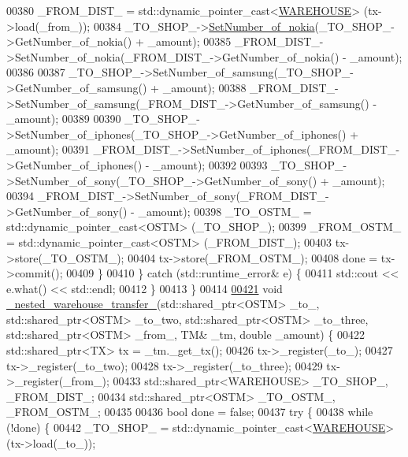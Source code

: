 \begin{DoxyCode}
00380             \_FROM\_DIST\_ = std::dynamic\_pointer\_cast<\hyperlink{class_w_a_r_e_h_o_u_s_e}{WAREHOUSE}> (tx->load(\_from\_));
00384             \_TO\_SHOP\_->\hyperlink{class_w_a_r_e_h_o_u_s_e_a13ace834a25aab61c689a7cedad94343}{SetNumber\_of\_nokia}(\_TO\_SHOP\_->GetNumber\_of\_nokia() + \_amount);
00385             \_FROM\_DIST\_->SetNumber\_of\_nokia(\_FROM\_DIST\_->GetNumber\_of\_nokia() - \_amount);
00386 
00387             \_TO\_SHOP\_->SetNumber\_of\_samsung(\_TO\_SHOP\_->GetNumber\_of\_samsung() + \_amount);
00388             \_FROM\_DIST\_->SetNumber\_of\_samsung(\_FROM\_DIST\_->GetNumber\_of\_samsung() - \_amount);
00389 
00390             \_TO\_SHOP\_->SetNumber\_of\_iphones(\_TO\_SHOP\_->GetNumber\_of\_iphones() + \_amount);
00391             \_FROM\_DIST\_->SetNumber\_of\_iphones(\_FROM\_DIST\_->GetNumber\_of\_iphones() - \_amount);
00392 
00393             \_TO\_SHOP\_->SetNumber\_of\_sony(\_TO\_SHOP\_->GetNumber\_of\_sony() + \_amount);
00394             \_FROM\_DIST\_->SetNumber\_of\_sony(\_FROM\_DIST\_->GetNumber\_of\_sony() - \_amount);
00398             \_TO\_OSTM\_ = std::dynamic\_pointer\_cast<OSTM> (\_TO\_SHOP\_);
00399             \_FROM\_OSTM\_ = std::dynamic\_pointer\_cast<OSTM> (\_FROM\_DIST\_);
00403             tx->store(\_TO\_OSTM\_);
00404             tx->store(\_FROM\_OSTM\_);
00408             done = tx->commit();
00409         \}
00410     \} \textcolor{keywordflow}{catch} (std::runtime\_error& e) \{
00411         std::cout << e.what() << std::endl;
00412     \}
00413 \}
00414 
\hypertarget{main_8cpp_source.tex_l00421}{}\hyperlink{main_8cpp_a52fcb0d50c67be8cd20f2aca338683c7}{00421} \textcolor{keywordtype}{void} \hyperlink{main_8cpp_a52fcb0d50c67be8cd20f2aca338683c7}{\_nested\_warehouse\_transfer\_}(std::shared\_ptr<OSTM> \_to\_, 
      std::shared\_ptr<OSTM> \_to\_two, std::shared\_ptr<OSTM> \_to\_three, std::shared\_ptr<OSTM> \_from\_, TM& \_tm, \textcolor{keywordtype}{double} \_amount) \{
00422     std::shared\_ptr<TX> tx = \_tm.\_get\_tx();
00426     tx->\_register(\_to\_);
00427     tx->\_register(\_to\_two);
00428     tx->\_register(\_to\_three);
00429     tx->\_register(\_from\_);
00433     std::shared\_ptr<WAREHOUSE> \_TO\_SHOP\_, \_FROM\_DIST\_;
00434     std::shared\_ptr<OSTM> \_TO\_OSTM\_, \_FROM\_OSTM\_;
00435 
00436     \textcolor{keywordtype}{bool} done = \textcolor{keyword}{false};
00437     \textcolor{keywordflow}{try} \{
00438         \textcolor{keywordflow}{while} (!done) \{
00442             \_TO\_SHOP\_ = std::dynamic\_pointer\_cast<\hyperlink{class_w_a_r_e_h_o_u_s_e}{WAREHOUSE}> (tx->load(\_to\_));

\end{DoxyCode}
